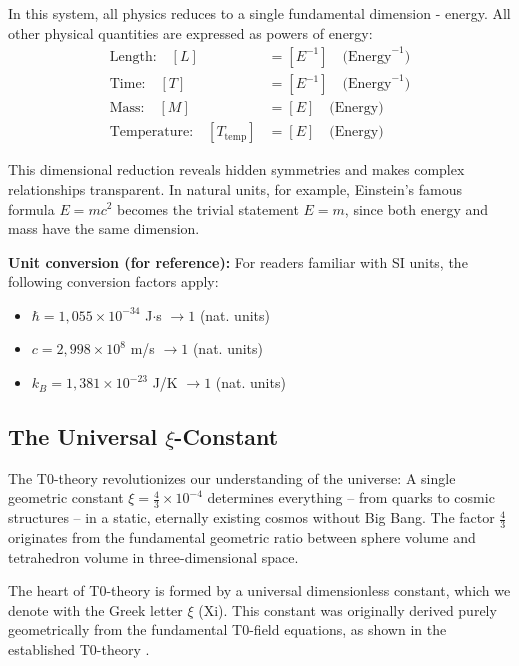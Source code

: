 \documentclass[12pt,a4paper]{report}
\begin{document}
	In this system, all physics reduces to a single fundamental dimension - energy. All other physical quantities are expressed as powers of energy:
	\begin{align}
		\text{Length:} \quad [L] &= [E^{-1}] \quad \text{(Energy}^{-1}\text{)} \\
		\text{Time:} \quad [T] &= [E^{-1}] \quad \text{(Energy}^{-1}\text{)} \\
		\text{Mass:} \quad [M] &= [E] \quad \text{(Energy)} \\
		\text{Temperature:} \quad [T_{\text{temp}}] &= [E] \quad \text{(Energy)}
	\end{align}
	
	This dimensional reduction reveals hidden symmetries and makes complex relationships transparent. In natural units, for example, Einstein's famous formula $E = mc^2$ becomes the trivial statement $E = m$, since both energy and mass have the same dimension.
	
	\textbf{Unit conversion (for reference):}
	For readers familiar with SI units, the following conversion factors apply:
	\begin{itemize}
		\item $\hbar = 1{,}055 \times 10^{-34}$ J$\cdot$s $\rightarrow 1$ (nat. units)
		\item $c = 2{,}998 \times 10^8$ m/s $\rightarrow 1$ (nat. units)  
		\item $k_B = 1{,}381 \times 10^{-23}$ J/K $\rightarrow 1$ (nat. units)
	\end{itemize}
	
	\subsection{The Universal $\xi$-Constant}
	
	\begin{revolutionary}
		The T0-theory revolutionizes our understanding of the universe: A single geometric constant $\xi = \frac{4}{3} \times 10^{-4}$ determines everything -- from quarks to cosmic structures -- in a static, eternally existing cosmos without Big Bang. The factor $\frac{4}{3}$ originates from the fundamental geometric ratio between sphere volume and tetrahedron volume in three-dimensional space.
	\end{revolutionary}
	
	The heart of T0-theory is formed by a universal dimensionless constant, which we denote with the Greek letter $\xi$ (Xi). This constant was originally derived purely geometrically from the fundamental T0-field equations, as shown in the established T0-theory \cite{T0Theory}.
	
\end{document}
